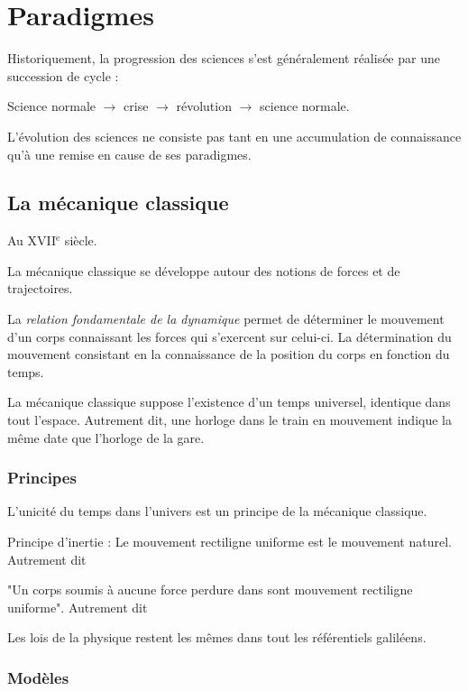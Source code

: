 
\section{Paradigmes}

Historiquement, la progression des sciences s'est généralement réalisée par une succession de cycle :
\begin{center}
Science normale $\to$ crise $\to$ révolution $\to$ science normale.
\end{center}
L'évolution des sciences ne consiste pas tant en une accumulation de connaissance qu'à une remise en cause de ses paradigmes.


  \subsection{La mécanique classique}

Au {\footnotesize XVII}$^\text{e}$ siècle.

La mécanique classique se développe autour des notions de forces et de trajectoires.

La {\it relation fondamentale de la dynamique} permet de déterminer le mouvement d'un corps connaissant les forces qui s'exercent sur celui-ci. La détermination du mouvement consistant en la connaissance de la position du corps en fonction du temps. 

La mécanique classique suppose l'existence d'un temps universel, identique dans tout l'espace. Autrement dit, une horloge dans le train en mouvement indique la même date que l'horloge de la gare.


  \subsubsection{Principes}

L'unicité du temps dans l'univers est un principe de la mécanique classique.

Principe d'inertie : Le mouvement rectiligne uniforme est le mouvement naturel. Autrement dit

"Un corps soumis à aucune force perdure dans sont mouvement rectiligne uniforme". Autrement dit

Les lois de la physique restent les mêmes dans tout les référentiels galiléens.

  \subsubsection{Modèles}

